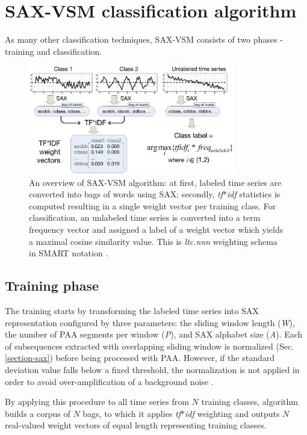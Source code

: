 \documentclass[conference]{IEEEtran}
\begin{document}
\vspace{0.1cm}
\section{SAX-VSM classification algorithm} \label{sax-vsm}
As many other classification techniques, SAX-VSM consists of two phases - 
training and classification. 

\begin{figure}[t]
   \centering
   \vspace{-0.05cm}
   \includegraphics[width=90mm]{figures/overview.eps}
   \caption{
   An overview of SAX-VSM algorithm: 
   at first, labeled time series are converted into bags of words using SAX; 
   secondly, \textit{tf$\ast$idf} statistics is computed resulting in 
   a single weight vector per training class. For classification, an unlabeled 
   time series is converted into a term frequency vector and assigned a 
   label of a weight vector which yields a maximal cosine similarity value.
   This is \textit{ltc.nnn} weighting schema in SMART notation \cite{logtf}.}
   \label{fig:overview}
   \vspace{-0.15cm}
\end{figure}

\subsection{Training phase}
The training starts by transforming the labeled time series into SAX representation
configured by three parameters: the sliding window length (\textit{W}), 
the number of PAA segments per window (\textit{P}), 
and SAX alphabet size (\textit{A}).
Each of subsequences extracted with overlapping sliding window 
is normalized (Sec. \ref{section-sax}) before being processed with PAA. 
However, if the standard deviation value falls below a fixed threshold, the 
normalization is not applied in order to avoid over-amplification 
of a background noise \cite{sax}. 

By applying this procedure to all time series from $N$ training classes, 
algorithm builds a corpus of $N$ bags, to which it applies \textit{tf$\ast$idf} 
weighting and outputs $N$ real-valued weight vectors of equal length 
representing training classes. 
\end{document}
